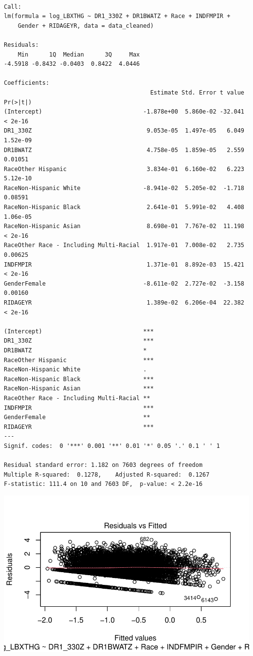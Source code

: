 \documentclass[
  letterpaper,
  DIV=11,
  numbers=noendperiod]{scrartcl}
\begin{document}
\begin{verbatim}

Call:
lm(formula = log_LBXTHG ~ DR1_330Z + DR1BWATZ + Race + INDFMPIR + 
    Gender + RIDAGEYR, data = data_cleaned)

Residuals:
    Min      1Q  Median      3Q     Max 
-4.5918 -0.8432 -0.0403  0.8422  4.0446 

Coefficients:
                                          Estimate Std. Error t value Pr(>|t|)
(Intercept)                             -1.878e+00  5.860e-02 -32.041  < 2e-16
DR1_330Z                                 9.053e-05  1.497e-05   6.049 1.52e-09
DR1BWATZ                                 4.758e-05  1.859e-05   2.559  0.01051
RaceOther Hispanic                       3.834e-01  6.160e-02   6.223 5.12e-10
RaceNon-Hispanic White                  -8.941e-02  5.205e-02  -1.718  0.08591
RaceNon-Hispanic Black                   2.641e-01  5.991e-02   4.408 1.06e-05
RaceNon-Hispanic Asian                   8.698e-01  7.767e-02  11.198  < 2e-16
RaceOther Race - Including Multi-Racial  1.917e-01  7.008e-02   2.735  0.00625
INDFMPIR                                 1.371e-01  8.892e-03  15.421  < 2e-16
GenderFemale                            -8.611e-02  2.727e-02  -3.158  0.00160
RIDAGEYR                                 1.389e-02  6.206e-04  22.382  < 2e-16
                                           
(Intercept)                             ***
DR1_330Z                                ***
DR1BWATZ                                *  
RaceOther Hispanic                      ***
RaceNon-Hispanic White                  .  
RaceNon-Hispanic Black                  ***
RaceNon-Hispanic Asian                  ***
RaceOther Race - Including Multi-Racial ** 
INDFMPIR                                ***
GenderFemale                            ** 
RIDAGEYR                                ***
---
Signif. codes:  0 '***' 0.001 '**' 0.01 '*' 0.05 '.' 0.1 ' ' 1

Residual standard error: 1.182 on 7603 degrees of freedom
Multiple R-squared:  0.1278,    Adjusted R-squared:  0.1267 
F-statistic: 111.4 on 10 and 7603 DF,  p-value: < 2.2e-16
\end{verbatim}

\includegraphics{_IDS702_Final_Report_Feedback_files/figure-pdf/unnamed-chunk-22-1.pdf}
\end{document}
